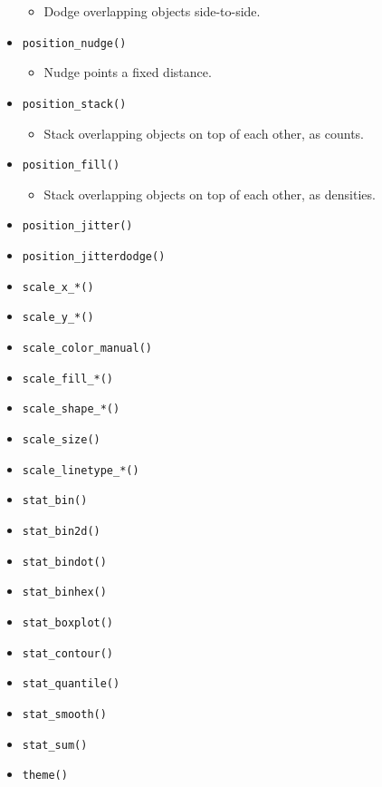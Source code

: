 \documentclass[
]{book}
\providecommand{\tightlist}{%
  \setlength{\itemsep}{0pt}\setlength{\parskip}{0pt}}
\begin{document}
\begin{itemize}
  \begin{itemize}
  \tightlist
  \item
    Dodge overlapping objects side-to-side.
  \end{itemize}
\item
  \texttt{position\_nudge()}

  \begin{itemize}
  \tightlist
  \item
    Nudge points a fixed distance.
  \end{itemize}
\item
  \texttt{position\_stack()}

  \begin{itemize}
  \tightlist
  \item
    Stack overlapping objects on top of each other, as counts.
  \end{itemize}
\item
  \texttt{position\_fill()}

  \begin{itemize}
  \tightlist
  \item
    Stack overlapping objects on top of each other, as densities.
  \end{itemize}
\item
  \texttt{position\_jitter()}
\item
  \texttt{position\_jitterdodge()}
\item
  \texttt{scale\_x\_*()}
\item
  \texttt{scale\_y\_*()}
\item
  \texttt{scale\_color\_manual()}
\item
  \texttt{scale\_fill\_*()}
\item
  \texttt{scale\_shape\_*()}
\item
  \texttt{scale\_size()}
\item
  \texttt{scale\_linetype\_*()}
\item
  \texttt{stat\_bin()}
\item
  \texttt{stat\_bin2d()}
\item
  \texttt{stat\_bindot()}
\item
  \texttt{stat\_binhex()}
\item
  \texttt{stat\_boxplot()}
\item
  \texttt{stat\_contour()}
\item
  \texttt{stat\_quantile()}
\item
  \texttt{stat\_smooth()}
\item
  \texttt{stat\_sum()}
\item
  \texttt{theme()}


\end{itemize}
\end{document}
